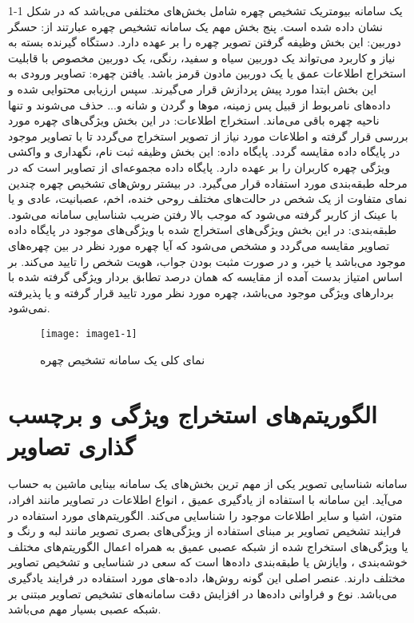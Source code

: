 یک سامانه بیومتریک تشخیص چهره شامل بخش‌های مختلفی می‌باشد که در شکل 1-1 نشان داده شده است. پنج بخش مهم یک سامانه تشخیص چهره عبارتند از:
حسگر دوربین: این بخش وظیفه گرفتن تصویر چهره را بر عهده دارد. دستگاه گیرنده بسته به نیاز و کاربرد می‌تواند یک دوربین سیاه و سفید، رنگی، یک دوربین مخصوص با قابلیت استخراج اطلاعات عمق یا یک دوربین مادون قرمز باشد.
یافتن چهره: تصاویر ورودی به این بخش ابتدا مورد پیش پردازش قرار می‌گیرند. سپس ارزیابی محتوایی شده و داده‌های نامربوط از قبیل پس زمینه، موها و گردن و شانه و... حذف می‌شوند و تنها ناحیه چهره باقی می‌ماند.
استخراج اطلاعات: در این بخش ویژگی‌های چهره مورد بررسی قرار گرفته و اطلاعات مورد نیاز از تصویر استخراج می‌گردد تا با تصاویر موجود در پایگاه داده مقایسه گردد.
پایگاه داده: این بخش وظیفه ثبت نام، نگهداری و واکشی ویژگی چهره کاربران را بر عهده دارد. پایگاه داده مجموعه‌ای از تصاویر است که در مرحله طبقه‌بندی مورد استفاده قرار می‌گیرد. در بیشتر روش‌های تشخیص چهره چندین نمای متفاوت از یک شخص در حالت‌های مختلف روحی خنده، اخم، عصبانیت، عادی و یا با عینک از کاربر گرفته می‌شود که موجب بالا رفتن ضریب شناسایی سامانه می‌شود.
طبقه‌بندی: در این بخش ویژگی‌های استخراج شده با ویژگی‌های موجود در پایگاه داده تصاویر مقایسه می‌گردد و مشخص می‌شود که آیا چهره مورد نظر در بین چهره‌های موجود می‌باشد یا خیر، و در صورت مثبت بودن جواب، هویت شخص را تایید می‌کند. بر اساس امتیاز بدست آمده از مقایسه که همان درصد تطابق بردار ویژگی گرفته شده با بردارهای ویژگی موجود می‌باشد، چهره مورد نظر مورد تایید قرار گرفته و یا پذیرفته نمی‌شود.
\begin{figure}[!h]
\centering
\texttt{[image: image1-1]}
\caption{ نمای کلی یک سامانه تشخیص چهره \cite{ref20}}\label{image1-1}
\end{figure}

\section{ الگوریتم‌های استخراج ویژگی و برچسب گذاری تصاویر }
سامانه شناسایی تصویر یکی از مهم ترین بخش‌های یک سامانه بینایی ماشین به حساب می‌آید. این سامانه با استفاده از یادگیری عمیق ، انواع اطلاعات در تصاویر مانند افراد، متون، اشیا و سایر اطلاعات موجود را شناسایی می‌کند. 
الگوریتم‌های مورد استفاده در فرایند تشخیص تصاویر بر مبنای استفاده از ویژگی‌های بصری تصویر مانند لبه و رنگ و یا ویژگی‌های استخراج شده از شبكه‌ عصبی عمیق  به همراه اعمال الگوریتم‌های مختلف خوشه‌بندی ، وایازش  یا طبقه‌بندی  داده‌ها است که سعی در شناسایی و تشخیص تصاویر مختلف دارند. عنصر اصلی این گونه روش‌ها، داده-های مورد استفاده در فرایند یادگیری می‌باشد. نوع و فراوانی داده‌ها در افزایش دقت سامانه‌های تشخیص تصاویر مبتنی بر شبكه‌ عصبی بسیار مهم می‌باشد.


